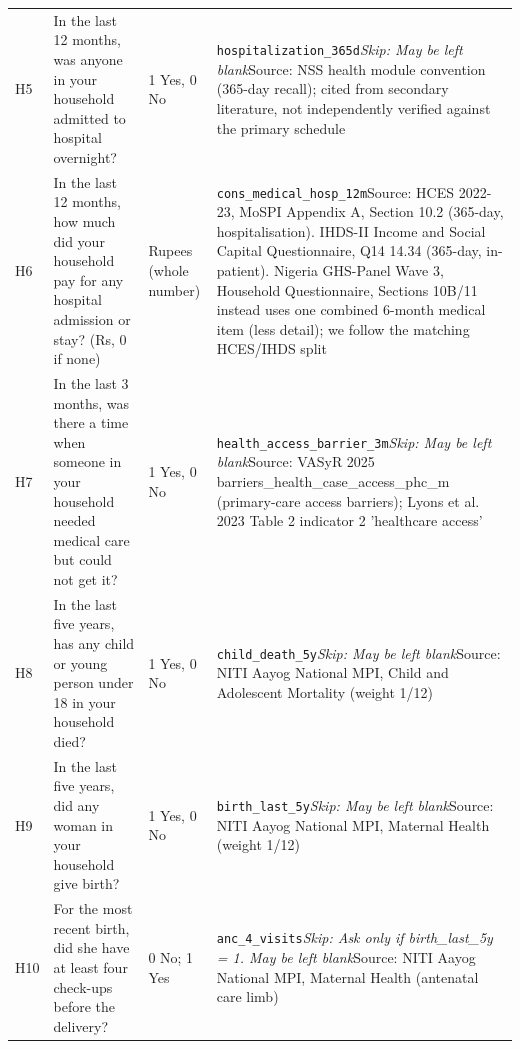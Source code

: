 \documentclass[10pt]{article}
\begin{document}
{\begin{longtable}{p{0.8cm}p{6.4cm}p{3.6cm}p{5.8cm}}
H5 & In the last 12 months, was anyone in your household admitted to hospital overnight? & 1 Yes, 0 No & \texttt{hospitalization\_365d}\newline \textit{Skip: May be left blank}\newline Source: NSS health module convention (365-day recall); cited from secondary literature, not independently verified against the primary schedule \\
H6 & In the last 12 months, how much did your household pay for any hospital admission or stay? (Rs, 0 if none) & Rupees (whole number) & \texttt{cons\_medical\_hosp\_12m}\newline Source: HCES 2022-23, MoSPI Appendix A, Section 10.2 (365-day, hospitalisation). IHDS-II Income and Social Capital Questionnaire, Q14 14.34 (365-day, in-patient). Nigeria GHS-Panel Wave 3, Household Questionnaire, Sections 10B/11 instead uses one combined 6-month medical item (less detail); we follow the matching HCES/IHDS split \\
H7 & In the last 3 months, was there a time when someone in your household needed medical care but could not get it? & 1 Yes, 0 No & \texttt{health\_access\_barrier\_3m}\newline \textit{Skip: May be left blank}\newline Source: VASyR 2025 barriers\_health\_case\_access\_phc\_m (primary-care access barriers); Lyons et al. 2023 Table 2 indicator 2 'healthcare access' \\
H8 & In the last five years, has any child or young person under 18 in your household died? & 1 Yes, 0 No & \texttt{child\_death\_5y}\newline \textit{Skip: May be left blank}\newline Source: NITI Aayog National MPI, Child and Adolescent Mortality (weight 1/12) \\
H9 & In the last five years, did any woman in your household give birth? & 1 Yes, 0 No & \texttt{birth\_last\_5y}\newline \textit{Skip: May be left blank}\newline Source: NITI Aayog National MPI, Maternal Health (weight 1/12) \\
H10 & For the most recent birth, did she have at least four check-ups before the delivery? & 0 No; 1 Yes & \texttt{anc\_4\_visits}\newline \textit{Skip: Ask only if birth\_last\_5y = 1. May be left blank}\newline Source: NITI Aayog National MPI, Maternal Health (antenatal care limb) \\

\end{longtable}}
\end{document}
